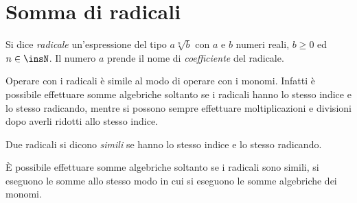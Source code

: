 \section{Somma di radicali}
Si dice \emph{radicale} un’espressione del tipo $a\sqrt[n]b$ con $a$ e $b$ numeri reali, $b{\geq}0$ ed $n\in \insN$. Il numero $a$ prende il nome di \emph{coefficiente} del radicale.

Operare con i radicali è simile al modo di operare con i monomi. Infatti è possibile effettuare somme algebriche soltanto se i radicali hanno lo stesso indice e lo stesso radicando, mentre si possono sempre effettuare moltiplicazioni e divisioni dopo averli ridotti allo stesso indice.
\begin{definizione}
 Due radicali si dicono \emph{simili} se hanno lo stesso indice e lo stesso radicando.
\end{definizione}

È possibile effettuare somme algebriche soltanto se i radicali sono simili, si eseguono le somme allo stesso modo in cui si eseguono le somme algebriche dei monomi.

